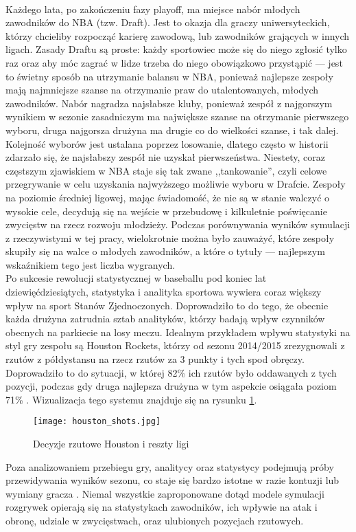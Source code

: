 \documentclass[inzynierska]{pwr_wmat_praca_dyplomowa}
\theoremstyle{plain}
\numberwithin{theorem}{chapter}
\theoremstyle{definition}
\numberwithin{theorem}{chapter}
\begin{document}
\\
\hspace*{6mm}Każdego lata, po zakończeniu fazy playoff, ma miejsce nabór młodych zawodników do NBA (tzw. Draft). Jest to okazja dla graczy uniwersyteckich, którzy chcieliby rozpocząć karierę zawodową, lub zawodników grających w innych ligach. Zasady Draftu są proste: każdy sportowiec może się do niego zgłosić tylko raz oraz aby móc zagrać w lidze trzeba do niego obowiązkowo przystąpić --- jest to świetny sposób na utrzymanie balansu w NBA, ponieważ najlepsze zespoły mają najmniejsze szanse na otrzymanie praw do utalentowanych, młodych zawodników. Nabór nagradza najsłabsze kluby, ponieważ zespół z najgorszym wynikiem w sezonie zasadniczym ma największe szanse na otrzymanie pierwszego wyboru, druga najgorsza drużyna ma drugie co do wielkości szanse, i tak dalej. Kolejność wyborów jest ustalana poprzez losowanie, dlatego często w historii zdarzało się, że najsłabszy zespół nie uzyskał pierwszeństwa. Niestety, coraz częstszym zjawiskiem w NBA staje się tak zwane ,,tankowanie'', czyli celowe przegrywanie w celu uzyskania najwyższego możliwie wyboru w Drafcie. Zespoły na poziomie średniej ligowej, mając świadomość, że nie są w stanie walczyć o wysokie cele, decydują się na wejście w przebudowę i kilkuletnie poświęcanie zwycięstw na rzecz rozwoju młodzieży. Podczas porównywania wyników symulacji z rzeczywistymi w tej pracy, wielokrotnie można było zauważyć, które zespoły skupiły się na walce o młodych zawodników, a które o tytuły --- najlepszym wskaźnikiem tego jest liczba wygranych.\\
\hspace*{6mm} Po sukcesie rewolucji statystycznej w baseballu pod koniec lat dziewięćdziesiątych, statystyka i analityka sportowa wywiera coraz większy wpływ na sport Stanów Zjednoczonych. Doprowadziło to do tego, że obecnie każda drużyna zatrudnia sztab analityków, którzy badają wpływ czynników obecnych na parkiecie na losy meczu. Idealnym przykładem wpływu statystyki na styl gry zespołu są Houston Rockets, którzy od sezonu 2014/2015 zrezygnowali z rzutów z półdystansu na rzecz rzutów za 3 punkty i tych spod obręczy. Doprowadziło to do sytuacji, w której 82\% ich rzutów było oddawanych z tych pozycji, podczas gdy druga najlepsza drużyna w tym aspekcie osiągała poziom 71\% \cite{houston}. Wizualizacja tego systemu znajduje się na rysunku \ref{houston_shots}.
\begin{figure}[h]
	\hspace*{-1cm}
	\texttt{[image: houston\_shots.jpg]}
	\caption{Decyzje rzutowe Houston i reszty ligi \cite{houston}}\label{houston_shots}
	\centering
\end{figure}
Poza analizowaniem przebiegu gry, analitycy oraz statystycy podejmują próby przewidywania wyników sezonu, co staje się bardzo istotne w razie kontuzji lub wymiany gracza \cite{replayNBA} \cite{graphicalNBA}. Niemal wszystkie zaproponowane dotąd modele symulacji rozgrywek opierają się na statystykach zawodników, ich wpływie na atak i obronę, udziale w zwycięstwach, oraz ulubionych pozycjach rzutowych. \\
\end{document}
